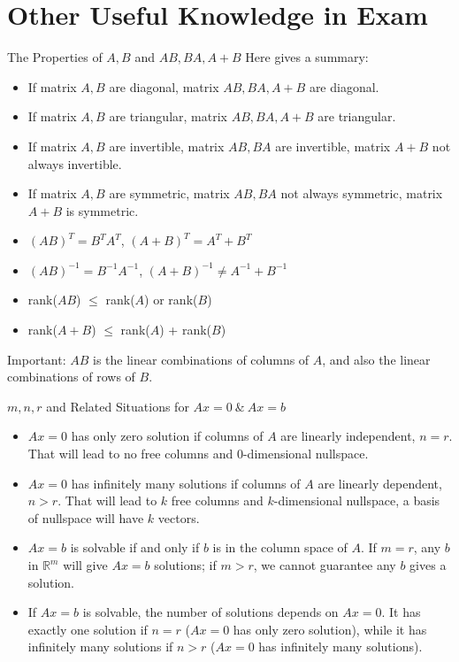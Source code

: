 \documentclass{beamer}
\begin{document}
\section{Other Useful Knowledge in Exam}
\begin{frame}{The Properties of $A,B$ and $AB,BA,A+B$}
Here gives a summary:
\begin{itemize}
    \item If matrix $A,B$ are diagonal, matrix $AB,BA,A+B$ are diagonal.
    \item If matrix $A,B$ are triangular, matrix $AB,BA,A+B$ are triangular.
    \item If matrix $A,B$ are invertible, matrix $AB,BA$ are invertible, matrix $A+B$ \alert{not always} invertible.
    \item If matrix $A,B$ are symmetric, matrix $AB,BA$ \alert{not always} symmetric, matrix $A+B$ is symmetric.
    \item $(AB)^T=B^TA^T$, $(A+B)^T=A^T+B^T$
    \item $(AB)^{-1}=B^{-1}A^{-1}$, $(A+B)^{-1}\ne A^{-1}+B^{-1}$

    \item rank($AB$) $\leqslant $ rank($A$) or rank($B$)
    \item rank($A+B$) $\leqslant $ rank($A$) + rank($B$)
\end{itemize}

Important: $AB$ is the linear combinations of columns of $A$, and also the linear combinations of rows of $B$.
\end{frame}

\begin{frame}{$m, n, r$ and Related Situations for $Ax=0\: \& \:Ax=b$}
\begin{itemize}
    \item $Ax=0$ has only zero solution if columns of $A$ are linearly independent, $n=r$. That will lead to no free columns and 0-dimensional nullspace.
    \item $Ax=0$ has infinitely many solutions if columns of $A$ are linearly dependent, $n>r$. That will lead to $k$ free columns and $k$-dimensional nullspace, a basis of nullspace will have $k$ vectors.
    \item $Ax=b$ is solvable if and only if $b$ is in the column space of $A$. If $m=r$, any $b$ in $\mathbb{R}^m$ will give $Ax=b$ solutions; if $m>r$, we cannot guarantee any $b$ gives a solution.
    \item If $Ax=b$ is solvable, the number of solutions depends on $Ax=0$. It has exactly one solution if $n=r$ ($Ax=0$ has only zero solution), while it has infinitely many solutions if $n>r$ ($Ax=0$ has infinitely many solutions).
\end{itemize}

\end{frame}
\end{document}
